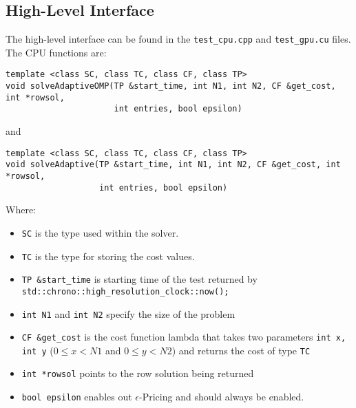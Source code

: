 \documentclass[format=acmsmall,review=false, screen=true]{acmart}
\begin{document}
\subsection{High-Level Interface}
The high-level interface can be found in the \texttt{test\_cpu.cpp} and \texttt{test\_gpu.cu} files. The CPU functions are:
\begin{verbatim}
template <class SC, class TC, class CF, class TP>
void solveAdaptiveOMP(TP &start_time, int N1, int N2, CF &get_cost, int *rowsol,
                      int entries, bool epsilon)
\end{verbatim}
and
\begin{verbatim}
template <class SC, class TC, class CF, class TP>
void solveAdaptive(TP &start_time, int N1, int N2, CF &get_cost, int *rowsol,
                   int entries, bool epsilon)
\end{verbatim}
Where:
\begin{itemize}\raggedright
\item \texttt{SC} is the type used within the solver.
\item \texttt{TC} is the type for storing the cost values.
\item \texttt{TP \&start\_time} is starting time of the test returned by  \texttt{std::chrono::high\_resolution\_clock::now();}
\item \texttt{int N1} and \texttt{int N2} specify the size of the problem
\item \texttt{CF \&get\_cost} is the cost function lambda that takes two parameters \texttt{int x, int y} ($0 \leq x < N1$ and $0 \leq y < N2$) and returns the cost of type \texttt{TC}
\item \texttt{int *rowsol} points to the row solution being returned
\item \texttt{bool epsilon} enables out $\epsilon$-Pricing and should always be enabled.
\end{itemize}
\end{document}
